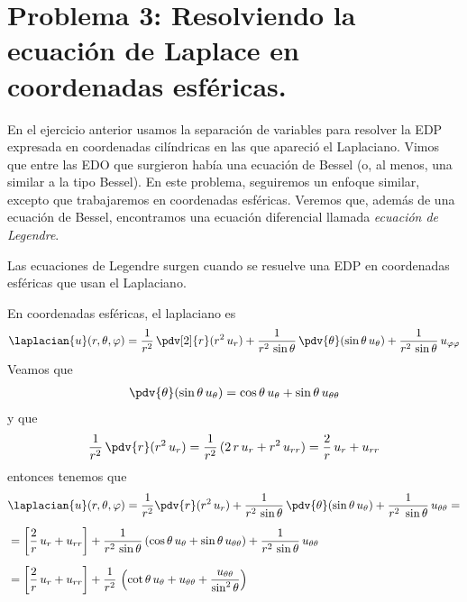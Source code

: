 \section{Problema 3: Resolviendo la ecuación de Laplace en coordenadas esféricas.}
En el ejercicio anterior usamos la separación de variables para resolver la EDP expresada en coordenadas cilíndricas en las que apareció el Laplaciano. Vimos que entre las EDO que surgieron había una ecuación de Bessel (o, al menos, una similar a la tipo Bessel). En este problema, seguiremos un enfoque similar, excepto que trabajaremos en coordenadas esféricas. Veremos que, además de una ecuación de Bessel, encontramos una ecuación diferencial llamada \emph{ecuación de Legendre}.
\par
Las ecuaciones de Legendre surgen cuando se resuelve una EDP en coordenadas esféricas que usan el Laplaciano. 
\par
En coordenadas esféricas, el laplaciano es
\begin{align*}
\laplacian{u} (r, \theta, \varphi) = \dfrac{1}{r^{2}} \, \pdv[2]{r} (r^{2} \, u_{r}) + \dfrac{1}{r^{2} \, \sin \theta} \, \pdv{\theta} (\sin \theta \, u_{\theta}) + \dfrac{1}{r^{2} \, \sin \theta} \, u_{\varphi \varphi}
\end{align*}
Veamos que
\begin{align*}
\pdv{\theta}(\sin \theta \, u_{\theta}) = \cos \theta \, u_{\theta} + \sin \theta \, u_{\theta \theta}
\end{align*}
y que
\begin{align*}
\dfrac{1}{r^{2}} \, \pdv{r} (r^{2} \, u_{r}) = \dfrac{1}{r^{2}} \, (2 \,r \, u_{r} + r^{2} \, u_{rr} ) = \dfrac{2}{r} \, u_{r} + u_{r r}
\end{align*}
entonces tenemos que
\begin{align}
&\laplacian{u} (r, \theta, \varphi) = \dfrac{1}{r^{2}} \pdv{r}(r^{2} \, u_{r}) + \dfrac{1}{r^{2} \, \sin \theta} \, \pdv{\theta} (\sin \theta \, u_{\theta}) + \dfrac{1}{r^{2} \ \sin \theta} \, u_{\theta \theta} = \nonumber \\[0.5em]
&= \left[ \dfrac{2}{r} \, u_{r} + u_{r r} \right] + \dfrac{1}{r^{2} \, \sin \theta} \left( \cos \theta \, u_{\theta} + \sin \theta \, u_{\theta \theta} \right) + \dfrac{1}{r^{2} \, \sin \theta} \, u_{\theta \theta} \label{eq:ecuacion_020} \\[0.5em]
&= \left[ \dfrac{2}{r} \, u_{r} + u_{r r} \right] + \dfrac{1}{r^{2}} \, \left( \cot \theta \, u_{\theta} + u_{\theta \theta} + \dfrac{u_{\theta \theta}}{\sin^{2} \theta} \right) \nonumber
\end{align}
